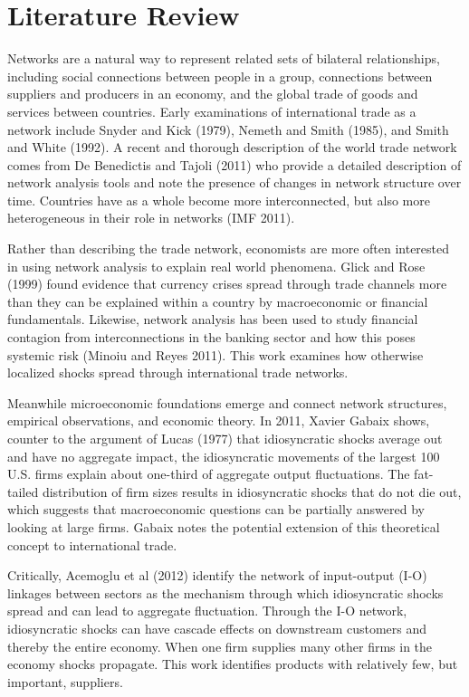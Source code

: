 \documentclass[10pt,letterpaper,pdftex]{article}
\begin{document}
\section{Literature Review}\thispagestyle{emptyheader} \label{litrev}

Networks are a natural way to represent related sets of bilateral relationships, including social connections between people in a group, connections between suppliers and producers in an economy, and the global trade of goods and services between countries. Early examinations of international trade as a network include Snyder and Kick (1979), Nemeth and Smith (1985), and Smith and White (1992). A recent and thorough description of the world trade network comes from De Benedictis and Tajoli (2011) who provide a detailed description of network analysis tools and note the presence of changes in network structure over time. Countries have as a whole become more interconnected, but also more heterogeneous in their role in networks (IMF 2011). 

Rather than describing the trade network, economists are more often interested in using network analysis to explain real world phenomena. Glick and Rose (1999) found evidence that currency crises spread through trade channels more than they can be explained within a country by macroeconomic or financial fundamentals. Likewise, network analysis has been used to study financial contagion from interconnections in the banking sector and how this poses systemic risk (Minoiu and Reyes 2011). This work examines how otherwise localized shocks spread through international trade networks.

Meanwhile microeconomic foundations emerge and connect network structures, empirical observations, and economic theory. In 2011, Xavier Gabaix shows, counter to the argument of Lucas (1977) that idiosyncratic shocks average out and have no aggregate impact, the idiosyncratic movements of the largest 100 U.S. firms explain about one-third of aggregate output fluctuations. The fat-tailed distribution of firm sizes results in idiosyncratic shocks that do not die out, which suggests that macroeconomic questions can be partially answered by looking at large firms. Gabaix notes the potential extension of this theoretical concept to international trade. 

Critically, Acemoglu et al (2012) identify the network of input-output (I-O) linkages between sectors as the mechanism through which idiosyncratic shocks spread and can lead to aggregate fluctuation. Through the I-O network, idiosyncratic shocks can have cascade effects on downstream customers and thereby the entire economy. When one firm supplies many other firms in the economy shocks propagate. This work identifies products with relatively few, but important, suppliers.
\end{document}
